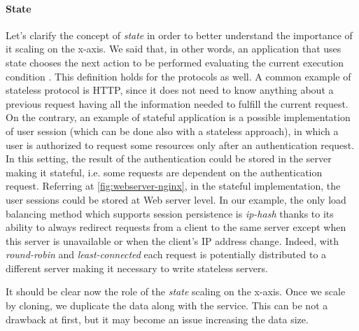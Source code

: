 \paragraph{State}
Let's clarify the concept of \emph{state} in order to better understand the
importance of it scaling on the x-axis. We said that, in other words, an
application that uses state chooses the next action to be performed evaluating
the current execution condition \cite{bib:art-of-scalability}. This definition
holds for the protocols as well. A common example of stateless protocol is HTTP,
since it does not need to know anything about a previous request having all the
information needed to fulfill the current request. On the contrary, an example
of stateful application is a possible implementation of user session (which can
be done also with a stateless approach), in which a user is authorized to
request some resources only after an authentication request. In this setting,
the result of the authentication could be stored in the server making it
stateful, i.e. some requests are dependent on the authentication request.
Referring at \autoref{fig:webserver-nginx}, in the stateful implementation, the
user sessions could be stored at Web server level. In our example, the only load
balancing method which supports session persistence is \emph{ip-hash} thanks to
its ability to always redirect requests from a client to the same server except
when this server is unavailable or when the client's IP address change. Indeed,
with \emph{round-robin} and \emph{least-connected} each request is potentially
distributed to a different server making it necessary to write stateless
servers.

It should be clear now the role of the \emph{state} scaling on the x-axis. Once
we scale by cloning, we duplicate the data along with the service. This can be
not a drawback at first, but it may become an issue increasing the data size.

